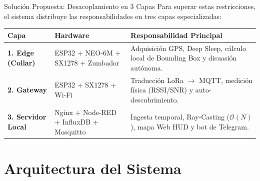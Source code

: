 \documentclass[aspectratio=43]{beamer}
\begin{document}
\begin{frame}{Solución Propuesta: Desacoplamiento en 3 Capas}
    \small
    Para superar estas restricciones, el sistema distribuye las responsabilidades en tres capas especializadas:
    
    \vspace{0.2cm}
    \begin{table}
        \centering
        \scriptsize
        \begin{tabular}{p{2.2cm} p{2.8cm} p{4.6cm}}
            \toprule
            \textbf{Capa} & \textbf{Hardware} & \textbf{Responsabilidad Principal} \\
            \midrule
            \textbf{1. Edge (Collar)} & ESP32 + NEO-6M + SX1278 + Zumbador & Adquisición GPS, Deep Sleep, cálculo local de Bounding Box y disuasión autónoma. \\
            \addlinespace
            \textbf{2. Gateway} & ESP32 + SX1278 + Wi-Fi & Traducción LoRa $\rightarrow$ MQTT, medición física (RSSI/SNR) y auto-descubrimiento. \\
            \addlinespace
            \textbf{3. Servidor Local} & Nginx + Node-RED + InfluxDB + Mosquitto & Ingesta temporal, Ray-Casting ($\mathcal{O}(N)$), mapa Web HUD y bot de Telegram. \\
            \bottomrule
        \end{tabular}
    \end{table}
\end{frame}

\section{Arquitectura del Sistema}
\end{document}
